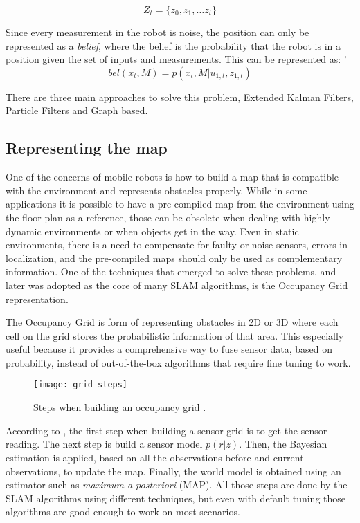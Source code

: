 \begin{equation}
    Z_t = \{z_0, z_1, \dots z_t\}
\end{equation}

Since every measurement in the robot is noise, the position can only be represented as a \textit{belief}, where the belief is the probability that the robot is in a position given the set of inputs and measurements. This can be represented as:
'
\begin{equation}
    bel(x_t, M) = p(x_t, M | u_{1, t}, z_{1,t})
\end{equation}

There are three main approaches to solve this problem, Extended Kalman Filters, Particle Filters and Graph based.

\subsection{Representing the map}

One of the concerns of mobile robots is how to build a map that is compatible with the environment and represents obstacles properly. While in some applications it is possible to have a pre-compiled map from the environment using the floor plan as a reference, those can be obsolete when dealing with highly dynamic environments or when objects get in the way. Even in static environments, there is a need to compensate for faulty or noise sensors, errors in localization, and the pre-compiled maps should only be used as complementary information. One of the techniques that emerged to solve these problems, and later was adopted as the core of many SLAM algorithms, is the Occupancy Grid \cite{elfes1989using} representation.

The Occupancy Grid is form of representing obstacles in 2D or 3D where each cell on the grid stores the probabilistic information of that area. This especially useful because it provides a comprehensive way to fuse sensor data, based on probability, instead of out-of-the-box algorithms that require fine tuning to work.

\begin{figure}[!ht]
    \centering
    \texttt{[image: grid\_steps]}
    \caption{Steps when building an occupancy grid \cite{elfes1989using}.}
    \label{fig:grid_steps}
\end{figure}

According to , the first step when building a sensor grid is to get the sensor reading. The next step is build a sensor model $p(r|z)$. Then, the Bayesian estimation is applied, based on all the observations before and current observations, to update the map. Finally, the world model is obtained using an estimator such as \textit{maximum a posteriori} (MAP). All those steps are done by the SLAM algorithms using different techniques, but even with default tuning those algorithms are good enough to work on most scenarios.

